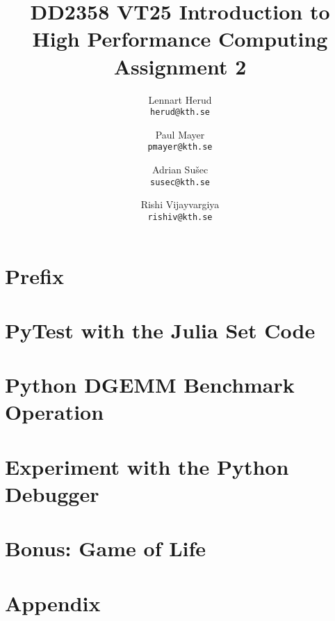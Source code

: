 \documentclass[a4paper,12pt]{article}
\title{
  \normalsize{DD2358 VT25 Introduction to}\\
  \normalsize{High Performance Computing}\\
  \large{Assignment 2}\\
}
\author{
  \small Lennart Herud\\[-0.75ex]
  \scriptsize\texttt{herud@kth.se}
  \and
    \small Paul Mayer\\[-0.75ex]
  \scriptsize\texttt{pmayer@kth.se}
  \and
    \small Adrian Sušec\\[-0.75ex]
  \scriptsize\texttt{susec@kth.se}
  \and
  \small Rishi Vijayvargiya\\[-0.75ex]
  \scriptsize\texttt{rishiv@kth.se}
}
\date{}
\begin{document}
\maketitle
\thispagestyle{firstpagestyle}

\listoftodos

\vspace{1em}

%
\section*{Prefix}

%

\section{PyTest with the Julia Set Code}
\section{Python DGEMM Benchmark Operation}
\section{Experiment with the Python Debugger}
\section{Bonus: Game of Life}
\section{Appendix}


\end{document}
